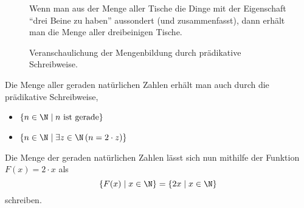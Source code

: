 \begin{figure*}[h]
\begin{example}
Wenn man aus der Menge aller Tische die Dinge mit der Eigenschaft ``drei Beine zu haben'' aussondert (und zusammenfasst), dann erhält man die Menge aller dreibeinigen Tische.
\begin{center}
\begin{framed}
\def\firstcircle{(0,0) circle (2cm)}
\def\secondcircle{(0.5,-1.8) circle (1.5cm)}



\setlength{\parskip}{5mm}

\caption*{Veranschaulichung der Mengenbildung durch prädikative Schreibweise.}
\end{framed}
\end{center}
\end{example}
\end{figure*}

\begin{example}
Die Menge aller geraden natürlichen Zahlen erhält man auch durch die prädikative Schreibweise,
\begin{itemize}
\item $\{n\in\N\mid n\text{ ist gerade}\}$
\item $\{n\in\N\mid \exists z\in\N\,(n=2\cdot z)\}$
\end{itemize}
\end{example}

\begin{example}
Die Menge der geraden natürlichen Zahlen lässt sich nun mithilfe der Funktion $F(x)=2\cdot x$ als
\[
\{F(x)\mid x\in\N\} = \{2x\mid x\in\N\}
\]
schreiben.
\end{example}

